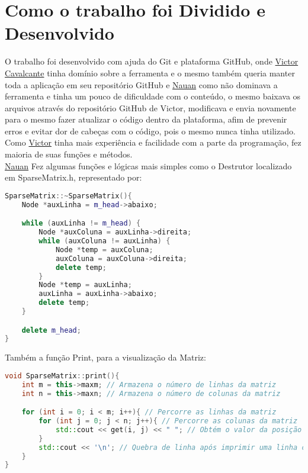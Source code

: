 \documentclass[a4paper,12pt]{article}
\begin{document}
\section{Como o trabalho foi Dividido e Desenvolvido}
O trabalho foi desenvolvido com ajuda do Git e plataforma GitHub, onde \underline{Victor Cavalcante} tinha domínio sobre a ferramenta e o mesmo também queria manter toda a aplicação em seu repositório GitHub e \underline{Nauan} como não dominava a ferramenta e tinha um pouco de dificuldade com o conteúdo, o mesmo baixava os arquivos através do repositório GitHub de Victor, modificava e envia novamente para o mesmo fazer atualizar o código dentro da plataforma, afim de prevenir erros e evitar dor de cabeças com o código, pois o mesmo nunca tinha utilizado.
\\Como \underline{Victor} tinha mais experiência e facilidade com a parte da programação, fez maioria de suas funções e métodos.
\\\underline{Nauan} Fez algumas funções e lógicas mais simples como o Destrutor localizado em SparseMatrix.h, representado por:

\begin{lstlisting}[language=C++]
SparseMatrix::~SparseMatrix(){
    Node *auxLinha = m_head->abaixo;

    while (auxLinha != m_head) {
        Node *auxColuna = auxLinha->direita;
        while (auxColuna != auxLinha) {
            Node *temp = auxColuna;
            auxColuna = auxColuna->direita;
            delete temp;
        }
        Node *temp = auxLinha;
        auxLinha = auxLinha->abaixo;
        delete temp;
    }

    delete m_head;
}
\end{lstlisting}

Também a função Print, para a visualização da Matriz:

\begin{lstlisting}[language=C++]
void SparseMatrix::print(){
    int m = this->maxm; // Armazena o número de linhas da matriz
    int n = this->maxn; // Armazena o número de colunas da matriz

    for (int i = 0; i < m; i++){ // Percorre as linhas da matriz
        for (int j = 0; j < n; j++){ // Percorre as colunas da matriz
            std::cout << get(i, j) << " "; // Obtém o valor da posição (i, j) e imprime na tela
        }
        std::cout << '\n'; // Quebra de linha após imprimir uma linha completa da matriz
    }
}
\end{lstlisting}
\end{document}
